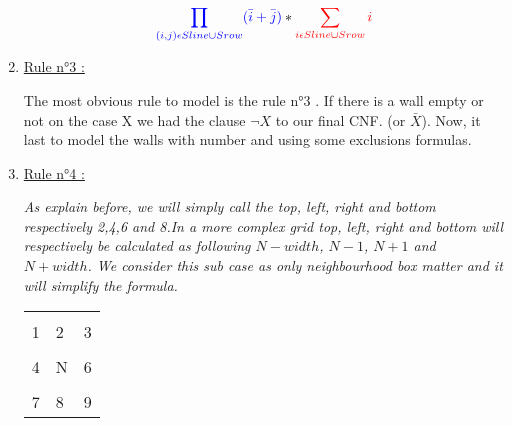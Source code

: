 \documentclass[a4paper]{article}
\begin{document}
\begin{enumerate}
$$ \textcolor{blue}{\prod_{ (i,j) \epsilon Sline \cup Srow} ( \bar{i} + \bar{j} )} * \textcolor{red}{\sum_{i \epsilon Sline \cup Srow} i}$$

	\item \underline{Rule n°3 :}
	\medskip
	\newline


 The most obvious rule to model is the rule n°3 . If there is a wall empty or not on the case X we had the clause $\neg X$ to our final CNF. (or $\bar{X}$). \newline
Now, it last to model the walls with number and using some exclusions formulas.

	\item \underline{Rule n°4 :}
	\medskip
	\newline


\textit{As explain before, we will simply call the top, left, right and bottom respectively 2,4,6 and 8.In a more complex grid top, left, right and bottom will respectively be calculated as following $N-width$, $N-1$, $N+1$ and $N+width$.  We consider this sub case as only neighbourhood box matter and it will simplify the formula. }

\begin{center}
	\begin{tabular}{|m{}|m{}|m{}|}
        \hline
            &   &      \\[1ex]
          1 & 2 & 3  \\[2ex]
        \hline
            & \cellcolor[gray]{0.5}   &   \\[1ex]
          4 & \cellcolor[gray]{0.5} N & 6 \\[2ex]
        \hline
            &   &   \\[1ex]
          7 & 8 & 9 \\[2ex]
        \hline
      \end{tabular}
\end{center}


\end{enumerate}
\end{document}
